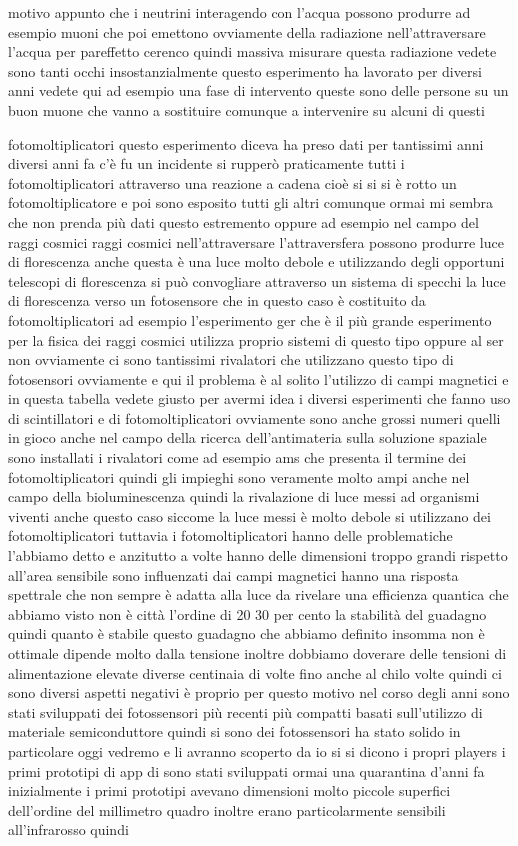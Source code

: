 motivo appunto che i neutrini interagendo con l'acqua possono produrre ad esempio muoni che poi emettono ovviamente della radiazione nell'attraversare l'acqua per pareffetto cerenco quindi massiva misurare questa radiazione vedete sono tanti occhi insostanzialmente questo esperimento ha lavorato per diversi anni vedete qui ad esempio una fase di intervento queste sono delle persone su un buon muone che vanno a sostituire comunque a intervenire su alcuni di questi 

fotomoltiplicatori questo esperimento diceva ha preso dati per tantissimi anni diversi anni fa c'è fu un incidente si rupperò praticamente tutti i fotomoltiplicatori attraverso una reazione a cadena cioè si si si è rotto un fotomoltiplicatore e poi sono esposito tutti gli altri comunque ormai mi sembra che non prenda più dati questo estremento oppure ad esempio nel campo del raggi cosmici raggi cosmici nell'attraversare l'attraversfera possono produrre luce di florescenza anche questa è una luce molto debole e utilizzando degli opportuni telescopi di florescenza si può convogliare attraverso un sistema di specchi la luce di florescenza verso un fotosensore che in questo caso è costituito da fotomoltiplicatori ad esempio l'esperimento ger che è il più grande esperimento per la fisica dei raggi cosmici utilizza proprio sistemi di questo tipo oppure al ser non ovviamente ci sono tantissimi rivalatori che utilizzano questo tipo di fotosensori ovviamente e qui il problema è al solito l'utilizzo di campi magnetici e in questa tabella vedete giusto per avermi idea i diversi esperimenti che fanno uso di scintillatori e di fotomoltiplicatori ovviamente sono anche grossi numeri quelli in gioco anche nel campo della ricerca dell'antimateria sulla soluzione spaziale sono installati i rivalatori come ad esempio ams che presenta il termine dei fotomoltiplicatori quindi gli impieghi sono veramente molto ampi anche nel campo della bioluminescenza quindi la rivalazione di luce messi ad organismi viventi anche questo caso siccome la luce messi è molto debole si utilizzano dei fotomoltiplicatori tuttavia i fotomoltiplicatori hanno delle problematiche l'abbiamo detto e anzitutto a volte hanno delle dimensioni troppo grandi rispetto all'area sensibile sono influenzati dai campi magnetici hanno una risposta spettrale che non sempre è adatta alla luce da rivelare una efficienza quantica che abbiamo visto non è città l'ordine di 20 30 per cento la stabilità del guadagno quindi quanto è stabile questo guadagno che abbiamo definito insomma non è ottimale dipende molto dalla tensione inoltre dobbiamo doverare delle tensioni di alimentazione elevate diverse centinaia di volte fino anche al chilo volte quindi ci sono diversi aspetti negativi è proprio per questo motivo nel corso degli anni sono stati sviluppati dei fotossensori più recenti più compatti basati sull'utilizzo di materiale semiconduttore quindi si sono dei fotossensori ha stato solido in particolare oggi vedremo e li avranno scoperto da io si si dicono i propri players i primi prototipi di app di sono stati sviluppati ormai una quarantina d'anni fa inizialmente i primi prototipi avevano dimensioni molto piccole superfici dell'ordine del millimetro quadro inoltre erano particolarmente sensibili all'infrarosso quindi 